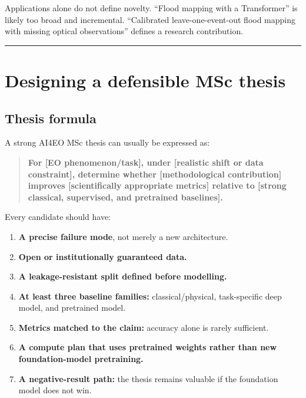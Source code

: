 \documentclass[
  a4paper,
  11pt]{article}
\providecommand{\tightlist}{%
  \setlength{\itemsep}{0pt}\setlength{\parskip}{0pt}}
\begin{document}
Applications alone do not define novelty. ``Flood mapping with a
Transformer'' is likely too broad and incremental. ``Calibrated
leave-one-event-out flood mapping with missing optical observations''
defines a research contribution.

\begin{center}\rule{0.5\linewidth}{0.5pt}\end{center}

\hypertarget{designing-a-defensible-msc-thesis}{%
\section{Designing a defensible MSc
thesis}\label{designing-a-defensible-msc-thesis}}

\hypertarget{thesis-formula}{%
\subsection{Thesis formula}\label{thesis-formula}}

A strong AI4EO MSc thesis can usually be expressed as:

\begin{quote}
\textbf{For {[}EO phenomenon/task{]}, under {[}realistic shift or data
constraint{]}, determine whether {[}methodological contribution{]}
improves {[}scientifically appropriate metrics{]} relative to {[}strong
classical, supervised, and pretrained baselines{]}.}
\end{quote}

Every candidate should have:

\begin{enumerate}
\def\labelenumi{\arabic{enumi}.}
\tightlist
\item
  \textbf{A precise failure mode}, not merely a new architecture.
\item
  \textbf{Open or institutionally guaranteed data.}
\item
  \textbf{A leakage-resistant split defined before modelling.}
\item
  \textbf{At least three baseline families:} classical/physical,
  task-specific deep model, and pretrained model.
\item
  \textbf{Metrics matched to the claim:} accuracy alone is rarely
  sufficient.
\item
  \textbf{A compute plan that uses pretrained weights rather than new
  foundation-model pretraining.}
\item
  \textbf{A negative-result path:} the thesis remains valuable if the
  foundation model does not win.
\end{enumerate}
\end{document}
